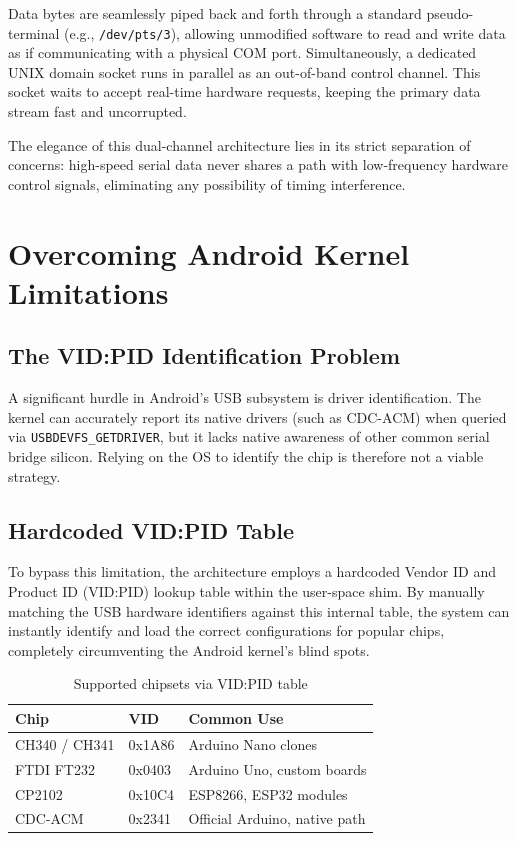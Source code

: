 \documentclass[conference]{IEEEtran}
\begin{document}
Data bytes are seamlessly piped back and forth through a standard pseudo-terminal (e.g., \texttt{/dev/pts/3}), allowing unmodified software to read and write data as if communicating with a physical COM port. \cite{unixsocket} Simultaneously, a dedicated UNIX domain socket runs in parallel as an out-of-band control channel. This socket waits to accept real-time hardware requests, keeping the primary data stream fast and uncorrupted.

The elegance of this dual-channel architecture lies in its strict separation of concerns: high-speed serial data never shares a path with low-frequency hardware control signals, eliminating any possibility of timing interference.

\section{Overcoming Android Kernel Limitations}
\label{sec:kernel}

\subsection{The VID:PID Identification Problem}

A significant hurdle in Android's USB subsystem is driver identification. The kernel can accurately report its native drivers (such as CDC-ACM) when queried via \texttt{USBDEVFS\_GETDRIVER}, but it lacks native awareness of other common serial bridge silicon. Relying on the OS to identify the chip is therefore not a viable strategy.

\subsection{Hardcoded VID:PID Table}

To bypass this limitation, the architecture employs a hardcoded Vendor ID and Product ID (VID:PID) lookup table within the user-space shim. By manually matching the USB hardware identifiers against this internal table, the system can instantly identify and load the correct configurations for popular chips, completely circumventing the Android kernel's blind spots.

\begin{table}[H]
\centering
\caption{Supported chipsets via VID:PID table}
\label{tab:chips}
\begin{tabular}{@{}lll@{}}
\toprule
\textbf{Chip} & \textbf{VID} & \textbf{Common Use} \\
\midrule
CH340 / CH341 & 0x1A86 & Arduino Nano clones \\
FTDI FT232    & 0x0403 & Arduino Uno, custom boards \\
CP2102        & 0x10C4 & ESP8266, ESP32 modules \\
CDC-ACM       & 0x2341 & Official Arduino, native path \\
\bottomrule
\end{tabular}
\end{table}
\end{document}
